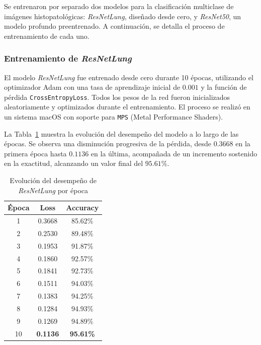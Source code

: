 \documentclass[conference]{IEEEtran}
\begin{document}
Se entrenaron por separado dos modelos para la clasificación multiclase de imágenes histopatológicas: \textit{ResNetLung}, diseñado desde cero, y \textit{ResNet50}, un modelo profundo preentrenado. A continuación, se detalla el proceso de entrenamiento de cada uno.

\hspace{0.5cm}

\subsubsection{Entrenamiento de \textit{ResNetLung}}

El modelo \textit{ResNetLung} fue entrenado desde cero durante 10 épocas, utilizando el optimizador Adam con una tasa de aprendizaje inicial de $0.001$ y la función de pérdida \texttt{CrossEntropyLoss}. Todos los pesos de la red fueron inicializados aleatoriamente y optimizados durante el entrenamiento. El proceso se realizó en un sistema macOS con soporte para \texttt{MPS} (Metal Performance Shaders).

La Tabla~\ref{tab:epochacc} muestra la evolución del desempeño del modelo a lo largo de las épocas. Se observa una disminución progresiva de la pérdida, desde $0.3668$ en la primera época hasta $0.1136$ en la última, acompañada de un incremento sostenido en la exactitud, alcanzando un valor final del $95.61\%$.

\begin{table}[ht]
\centering
\caption{Evolución del desempeño de \textit{ResNetLung} por época}
\begin{tabular}{|c|c|c|}
\hline
\textbf{Época} & \textbf{Loss} & \textbf{Accuracy} \\
\hline
1 & 0.3668 & 85.62\% \\
2 & 0.2530 & 89.48\% \\
3 & 0.1953 & 91.87\% \\
4 & 0.1860 & 92.57\% \\
5 & 0.1841 & 92.73\% \\
6 & 0.1511 & 94.03\% \\
7 & 0.1383 & 94.25\% \\
8 & 0.1284 & 94.93\% \\
9 & 0.1269 & 94.89\% \\
10 & \textbf{0.1136} & \textbf{95.61\%} \\
\hline
\end{tabular}
\label{tab:epochacc}
\end{table}
\end{document}
